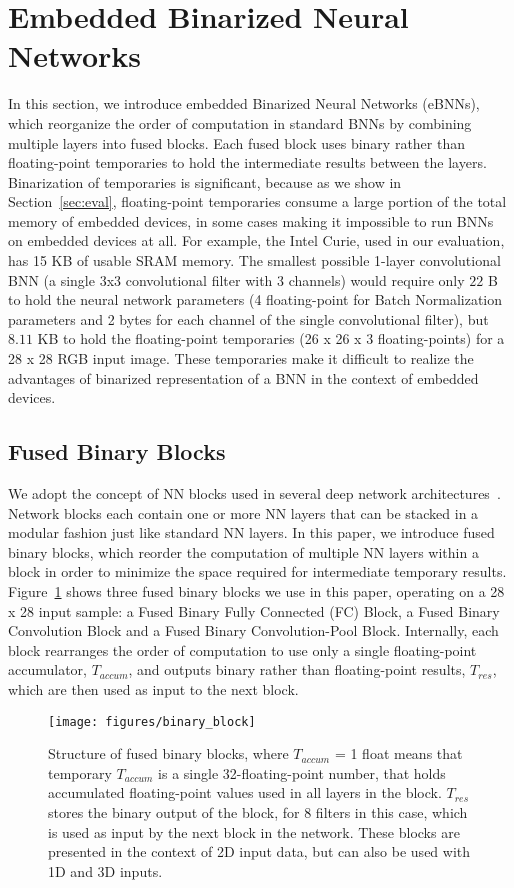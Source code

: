 \documentclass[10pt,emptycopyrightspace]{ewsn-proc}
\begin{document}
\section{Embedded Binarized Neural Networks}
\label{sec:model}
In this section, we introduce embedded Binarized Neural Networks (eBNNs), which reorganize the order of computation in standard BNNs by combining multiple layers into fused blocks. Each fused block uses binary rather than floating-point temporaries to hold the intermediate results between the layers. Binarization of temporaries is significant, because as we show in Section~\ref{sec:eval}, floating-point temporaries consume a large portion of the total memory of embedded devices, in some cases making it impossible to run BNNs on embedded devices at all. For example, the Intel Curie, used in our evaluation, has 15 KB of usable SRAM memory. The smallest possible 1-layer convolutional BNN (a single 3x3 convolutional filter with 3 channels) would require only $22$ B to hold the neural network parameters (4 floating-point for Batch Normalization parameters and 2 bytes for each channel of the single convolutional filter), but $8.11$ KB to hold the floating-point temporaries (26 x 26 x 3 floating-points) for a 28 x 28 RGB input image. These temporaries make it difficult to realize the advantages of binarized representation of a BNN in the context of embedded devices.

\subsection{Fused Binary Blocks}
We adopt the concept of NN blocks used in several deep network architectures~\cite{he2016identity}. Network blocks each contain one or more NN layers that can be stacked in a modular fashion just like standard NN layers. In this paper, we introduce fused binary blocks, which reorder the computation of multiple NN layers within a block in order to minimize the space required for intermediate temporary results. Figure~\ref{fig:binary_block} shows three fused binary blocks we use in this paper, operating on a 28 x 28 input sample: a Fused Binary Fully Connected (FC) Block, a Fused Binary Convolution Block and a Fused Binary Convolution-Pool Block. Internally, each block rearranges the order of computation to use only a single floating-point accumulator, $T_{accum}$, and outputs binary rather than floating-point results, $T_{res}$, which are then used as input to the next block.

\begin{figure}[b!]
  \centering
    \texttt{[image: figures/binary\_block]}
  \caption{Structure of fused binary blocks, where $T_{accum}$ = 1 float means that temporary $T_{accum}$ is a single 32-floating-point number, that holds accumulated floating-point values used in all layers in the block. $T_{res}$ stores the binary output of the block, for 8 filters in this case, which is used as input by the next block in the network. These blocks are presented in the context of 2D input data, but can also be used with 1D and 3D inputs.}
  \label{fig:binary_block}
\end{figure}
\end{document}
